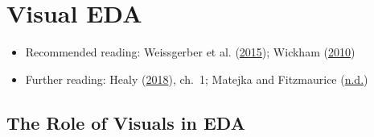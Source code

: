 \documentclass[
]{article}
\providecommand{\tightlist}{%
  \setlength{\itemsep}{0pt}\setlength{\parskip}{0pt}}
\begin{document}
\hypertarget{visual-eda}{%
\section{Visual EDA}\label{visual-eda}}

\begin{itemize}
\tightlist
\item
  Recommended reading: Weissgerber et al. (\protect\hyperlink{ref-WeissgerberBarLineGraphs2015}{2015}); Wickham (\protect\hyperlink{ref-WickhamLayeredGrammarGraphics2010}{2010})
\item
  Further reading: Healy (\protect\hyperlink{ref-HealyDataVisualizationPractical2018}{2018}), ch.~1; Matejka and Fitzmaurice (\protect\hyperlink{ref-MatejkaSameStatsDifferent}{n.d.})
\end{itemize}

\hypertarget{the-role-of-visuals-in-eda}{%
\subsection{The Role of Visuals in EDA}\label{the-role-of-visuals-in-eda}}
\end{document}
